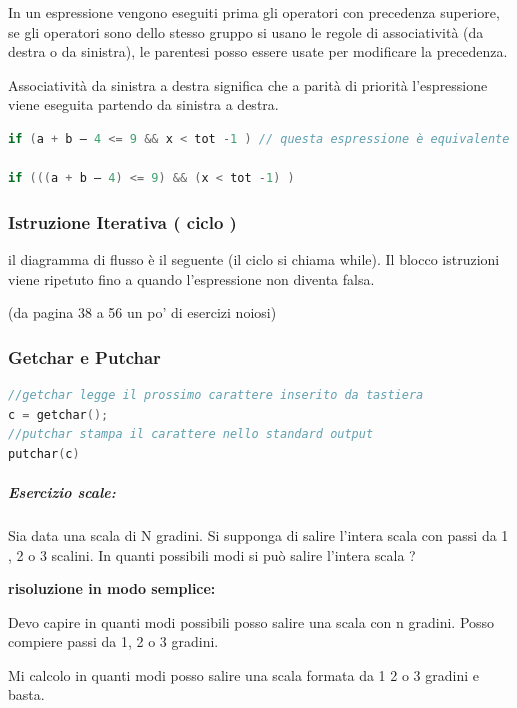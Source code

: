 \documentclass[
  paper=a4,
  oneside  ,captions=tableheading
]{scrbook}
\begin{document}
In un espressione vengono eseguiti prima gli operatori con precedenza
superiore, se gli operatori sono dello stesso gruppo si usano le regole
di associatività (da destra o da sinistra), le parentesi posso essere
usate per modificare la precedenza.

Associatività da sinistra a destra significa che a parità di priorità
l'espressione viene eseguita partendo da sinistra a destra.

\begin{lstlisting}[language={C++}]
if (a + b – 4 <= 9 && x < tot -1 ) // questa espressione è equivalente a quella sotto
    
if (((a + b – 4) <= 9) && (x < tot -1) )
\end{lstlisting}

\hypertarget{istruzione-iterativa-ciclo}{%
\subsubsection{Istruzione Iterativa ( ciclo
)}\label{istruzione-iterativa-ciclo}}

il diagramma di flusso è il seguente (il ciclo si chiama while). Il
blocco istruzioni viene ripetuto fino a quando l'espressione non diventa
falsa.

(da pagina 38 a 56 un po' di esercizi noiosi)

\hypertarget{getchar-e-putchar}{%
\subsubsection{Getchar e Putchar}\label{getchar-e-putchar}}

\begin{lstlisting}[language={C++}]
//getchar legge il prossimo carattere inserito da tastiera
c = getchar();
//putchar stampa il carattere nello standard output
putchar(c)
\end{lstlisting}

\hypertarget{esercizio-scale}{%
\subparagraph{Esercizio scale:}\label{esercizio-scale}}

Sia data una scala di N gradini. Si supponga di salire l'intera scala
con passi da 1 , 2 o 3 scalini. In quanti possibili modi si può salire
l'intera scala ?

\textbf{risoluzione in modo semplice:}

Devo capire in quanti modi possibili posso salire una scala con n
gradini. Posso compiere passi da 1, 2 o 3 gradini.

Mi calcolo in quanti modi posso salire una scala formata da 1 2 o 3
gradini e basta.
\end{document}
